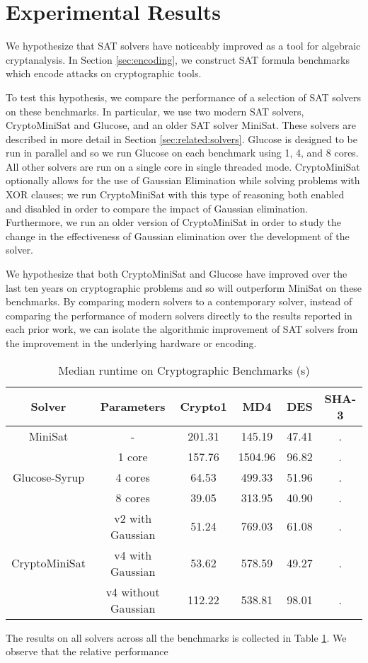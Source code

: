 \section{Experimental Results}
\label{sec:results}

We hypothesize that SAT solvers have noticeably improved as a tool for algebraic cryptanalysis. In Section \ref{sec:encoding}, we construct SAT formula benchmarks which encode attacks on cryptographic tools. 

To test this hypothesis, we compare the performance of a selection of SAT solvers on these benchmarks. In particular, we use two modern SAT solvers, CryptoMiniSat and Glucose, and an older SAT solver MiniSat. These solvers are described in more detail in Section \ref{sec:related:solvers}. Glucose is designed to be run in parallel and so we run Glucose on each benchmark using 1, 4, and 8 cores. All other solvers are run on a single core in single threaded mode. CryptoMiniSat optionally allows for the use of Gaussian Elimination while solving problems with XOR clauses; we run CryptoMiniSat with this type of reasoning both enabled and disabled in order to compare the impact of Gaussian elimination. Furthermore, we run an older version of CryptoMiniSat in order to study the change in the effectiveness of Gaussian elimination over the development of the solver.

We hypothesize that both CryptoMiniSat and Glucose have improved over the last ten years on cryptographic problems and so will outperform MiniSat on these benchmarks. By comparing modern solvers to a contemporary solver, instead of comparing the performance of modern solvers directly to the results reported in each prior work, we can isolate the algorithmic improvement of SAT solvers from the improvement in the underlying hardware or encoding.

\begin{table}[!htbp]
	\centering
	\begin{tabular}{|c|c|c|c|c|c|}
		\hline
		\textbf{Solver} & \textbf{Parameters} & \textbf{Crypto1} & \textbf{MD4} & \textbf{DES} & \textbf{SHA-3} \\
		\hline
		MiniSat & - & 201.31 & 145.19 & 47.41 & .\\
		\hline
		\multirow{3}{*}{Glucose-Syrup} & 1 core & 157.76 & 1504.96 & 96.82 & .\\ \cline{2-6}
		& 4 cores & 64.53 & 499.33 & 51.96 & .\\ \cline{2-6}
		& 8 cores & 39.05 & 313.95 & 40.90 & .\\
		\hline
		
		\multirow{3}{*}{CryptoMiniSat} & v2 with Gaussian & 51.24 & 769.03 & 61.08 & . \\ \cline{2-6}
		& v4 with Gaussian & 53.62 & 578.59 & 49.27 & . \\ \cline{2-6}
		& v4 without Gaussian & 112.22 & 538.81 & 98.01 & .\\
		\hline
	\end{tabular}
	
	\caption{Median runtime on Cryptographic Benchmarks (s)}
	\label{table:all:runtime}
\end{table}

The results on all solvers across all the benchmarks is collected in Table \ref{table:all:runtime}. We observe that the relative performance